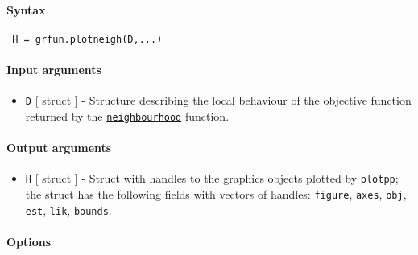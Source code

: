 


	\paragraph{Syntax}
 
 \begin{verbatim}
 H = grfun.plotneigh(D,...)
 \end{verbatim}
 
 \paragraph{Input arguments}
 
 \begin{itemize}
 \item
   \texttt{D} {[} struct {]} - Structure describing the local behaviour
   of the objective function returned by the
   \href{model/neighbourhood}{\texttt{neighbourhood}} function.
 \end{itemize}
 
 \paragraph{Output arguments}
 
 \begin{itemize}
 \item
   \texttt{H} {[} struct {]} - Struct with handles to the graphics
   objects plotted by \texttt{plotpp}; the struct has the following
   fields with vectors of handles: \texttt{figure}, \texttt{axes},
   \texttt{obj}, \texttt{est}, \texttt{lik}, \texttt{bounds}.
 \end{itemize}
 
 \paragraph{Options}
 
